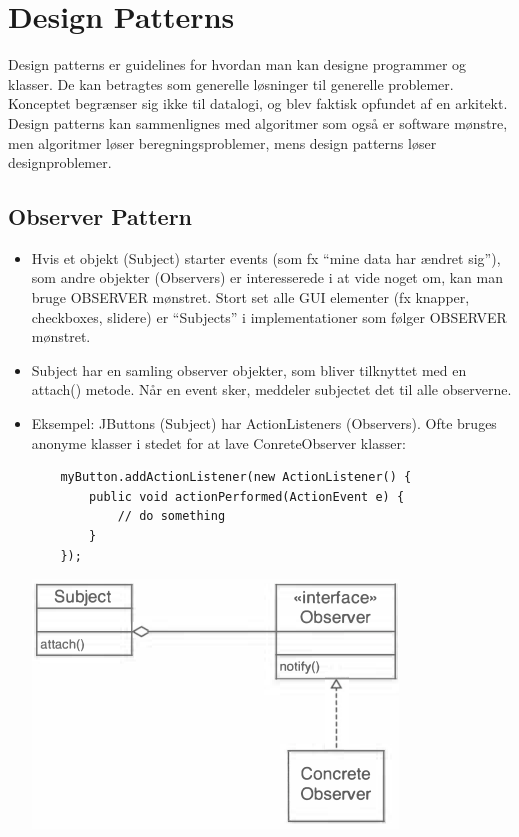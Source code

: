 \section{Design Patterns}

Design patterns er guidelines for hvordan man kan designe programmer og klasser. De kan betragtes som generelle løsninger til generelle problemer. Konceptet begrænser sig ikke til datalogi, og blev faktisk opfundet af en arkitekt. Design patterns kan sammenlignes med algoritmer som også er software mønstre, men algoritmer løser beregningsproblemer, mens design patterns løser designproblemer.

\subsection{Observer Pattern}

\begin{itemize}
  \item Hvis et objekt (Subject) starter events (som fx “mine data har ændret sig”), som andre objekter (Observers) er interesserede i at vide noget om, kan man bruge OBSERVER mønstret. Stort set alle GUI elementer (fx knapper, checkboxes, slidere) er “Subjects” i implementationer som følger OBSERVER mønstret.
  \item Subject har en samling observer objekter, som bliver tilknyttet med en attach() metode. Når en event sker, meddeler subjectet det til alle observerne.
  \item Eksempel: JButtons (Subject) har ActionListeners (Observers). Ofte bruges anonyme klasser i stedet for at lave ConreteObserver klasser:
  \begin{verbatim}
    myButton.addActionListener(new ActionListener() { 
        public void actionPerformed(ActionEvent e) {
            // do something
        }
    });
  \end{verbatim}
  
  \begin{center}
    \includegraphics[scale=0.8]{images/observer_horstman.png}
  \end{center}

\end{itemize}




